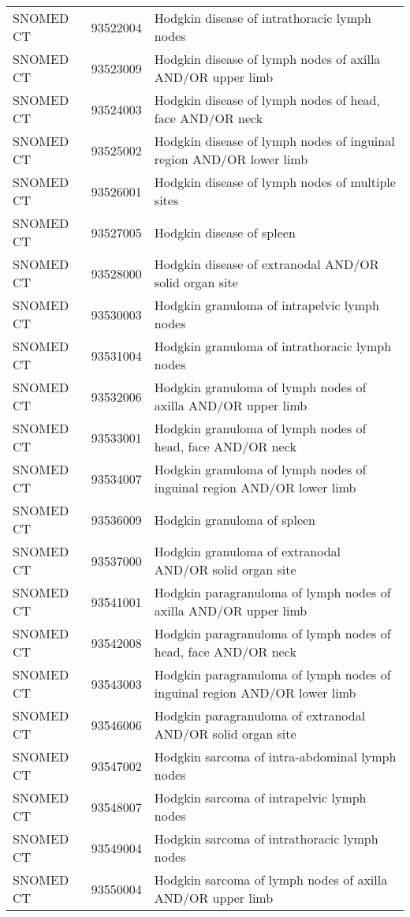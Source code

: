 \begin{longtable}{p{}p{}p{}}
  SNOMED CT & 93522004 & Hodgkin disease of intrathoracic lymph nodes \\ 
  SNOMED CT & 93523009 & Hodgkin disease of lymph nodes of axilla AND/OR upper limb \\ 
  SNOMED CT & 93524003 & Hodgkin disease of lymph nodes of head, face AND/OR neck \\ 
  SNOMED CT & 93525002 & Hodgkin disease of lymph nodes of inguinal region AND/OR lower limb \\ 
  SNOMED CT & 93526001 & Hodgkin disease of lymph nodes of multiple sites \\ 
  SNOMED CT & 93527005 & Hodgkin disease of spleen \\ 
  SNOMED CT & 93528000 & Hodgkin disease of extranodal AND/OR solid organ site \\ 
  SNOMED CT & 93530003 & Hodgkin granuloma of intrapelvic lymph nodes \\ 
  SNOMED CT & 93531004 & Hodgkin granuloma of intrathoracic lymph nodes \\ 
  SNOMED CT & 93532006 & Hodgkin granuloma of lymph nodes of axilla AND/OR upper limb \\ 
  SNOMED CT & 93533001 & Hodgkin granuloma of lymph nodes of head, face AND/OR neck \\ 
  SNOMED CT & 93534007 & Hodgkin granuloma of lymph nodes of inguinal region AND/OR lower limb \\ 
  SNOMED CT & 93536009 & Hodgkin granuloma of spleen \\ 
  SNOMED CT & 93537000 & Hodgkin granuloma of extranodal AND/OR solid organ site \\ 
  SNOMED CT & 93541001 & Hodgkin paragranuloma of lymph nodes of axilla AND/OR upper limb \\ 
  SNOMED CT & 93542008 & Hodgkin paragranuloma of lymph nodes of head, face AND/OR neck \\ 
  SNOMED CT & 93543003 & Hodgkin paragranuloma of lymph nodes of inguinal region AND/OR lower limb \\ 
  SNOMED CT & 93546006 & Hodgkin paragranuloma of extranodal AND/OR solid organ site \\ 
  SNOMED CT & 93547002 & Hodgkin sarcoma of intra-abdominal lymph nodes \\ 
  SNOMED CT & 93548007 & Hodgkin sarcoma of intrapelvic lymph nodes \\ 
  SNOMED CT & 93549004 & Hodgkin sarcoma of intrathoracic lymph nodes \\ 
  SNOMED CT & 93550004 & Hodgkin sarcoma of lymph nodes of axilla AND/OR upper limb \\ 

\end{longtable}
